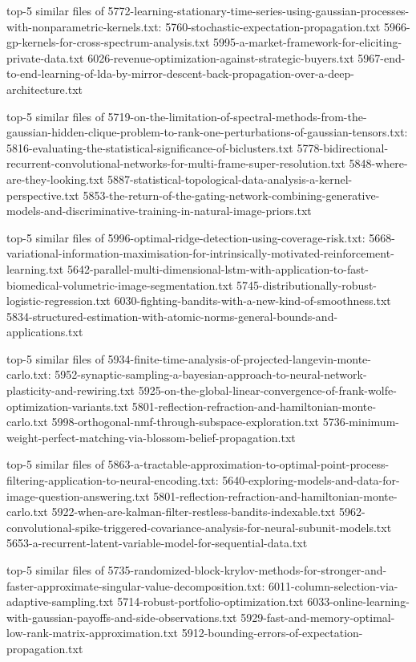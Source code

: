\documentclass[11pt]{article}
\begin{document}
top-5 similar files of
5772-learning-stationary-time-series-using-gaussian-processes-with-nonparametric-kernels.txt:
5760-stochastic-expectation-propagation.txt
5966-gp-kernels-for-cross-spectrum-analysis.txt
5995-a-market-framework-for-eliciting-private-data.txt
6026-revenue-optimization-against-strategic-buyers.txt
5967-end-to-end-learning-of-lda-by-mirror-descent-back-propagation-over-a-deep-architecture.txt

top-5 similar files of
5719-on-the-limitation-of-spectral-methods-from-the-gaussian-hidden-clique-problem-to-rank-one-perturbations-of-gaussian-tensors.txt:
5816-evaluating-the-statistical-significance-of-biclusters.txt
5778-bidirectional-recurrent-convolutional-networks-for-multi-frame-super-resolution.txt
5848-where-are-they-looking.txt
5887-statistical-topological-data-analysis-a-kernel-perspective.txt
5853-the-return-of-the-gating-network-combining-generative-models-and-discriminative-training-in-natural-image-priors.txt

top-5 similar files of
5996-optimal-ridge-detection-using-coverage-risk.txt:
5668-variational-information-maximisation-for-intrinsically-motivated-reinforcement-learning.txt
5642-parallel-multi-dimensional-lstm-with-application-to-fast-biomedical-volumetric-image-segmentation.txt
5745-distributionally-robust-logistic-regression.txt
6030-fighting-bandits-with-a-new-kind-of-smoothness.txt
5834-structured-estimation-with-atomic-norms-general-bounds-and-applications.txt

top-5 similar files of
5934-finite-time-analysis-of-projected-langevin-monte-carlo.txt:
5952-synaptic-sampling-a-bayesian-approach-to-neural-network-plasticity-and-rewiring.txt
5925-on-the-global-linear-convergence-of-frank-wolfe-optimization-variants.txt
5801-reflection-refraction-and-hamiltonian-monte-carlo.txt
5998-orthogonal-nmf-through-subspace-exploration.txt
5736-minimum-weight-perfect-matching-via-blossom-belief-propagation.txt

top-5 similar files of
5863-a-tractable-approximation-to-optimal-point-process-filtering-application-to-neural-encoding.txt:
5640-exploring-models-and-data-for-image-question-answering.txt
5801-reflection-refraction-and-hamiltonian-monte-carlo.txt
5922-when-are-kalman-filter-restless-bandits-indexable.txt
5962-convolutional-spike-triggered-covariance-analysis-for-neural-subunit-models.txt
5653-a-recurrent-latent-variable-model-for-sequential-data.txt

top-5 similar files of
5735-randomized-block-krylov-methods-for-stronger-and-faster-approximate-singular-value-decomposition.txt:
6011-column-selection-via-adaptive-sampling.txt
5714-robust-portfolio-optimization.txt
6033-online-learning-with-gaussian-payoffs-and-side-observations.txt
5929-fast-and-memory-optimal-low-rank-matrix-approximation.txt
5912-bounding-errors-of-expectation-propagation.txt
\end{document}
